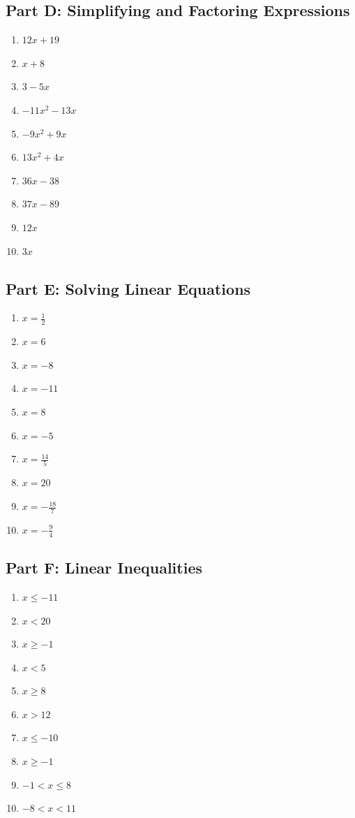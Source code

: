 \documentclass[11pt]{article}
\begin{document}
\subsection*{Part D: Simplifying and Factoring Expressions}
\begin{multicols}{3}
\begin{enumerate}
  \item $12 x + 19$
  \item $x + 8$
  \item $3 - 5 x$
  \item $- 11 x^{2} - 13 x$
  \item $- 9 x^{2} + 9 x$
  \item $13 x^{2} + 4 x$
  \item $36 x - 38$
  \item $37 x - 89$
  \item $12 x$
  \item $3 x$
\end{enumerate}
\end{multicols}
\subsection*{Part E: Solving Linear Equations}
\begin{multicols}{3}
\begin{enumerate}
  \item $x = \frac{1}{2}$
  \item $x = 6$
  \item $x = -8$
  \item $x = -11$
  \item $x = 8$
  \item $x = -5$
  \item $x = \frac{14}{5}$
  \item $x = 20$
  \item $x = - \frac{18}{7}$
  \item $x = - \frac{9}{4}$
\end{enumerate}
\end{multicols}
\subsection*{Part F: Linear Inequalities}
\begin{multicols}{3}
\begin{enumerate}
  \item $x \le -11$
  \item $x < 20$
  \item $x \ge -1$
  \item $x < 5$
  \item $x \ge 8$
  \item $x > 12$
  \item $x \le -10$
  \item $x \ge -1$
  \item $-1 < x \le 8$
  \item $-8 < x < 11$
\end{enumerate}
\end{multicols}
\end{document}
